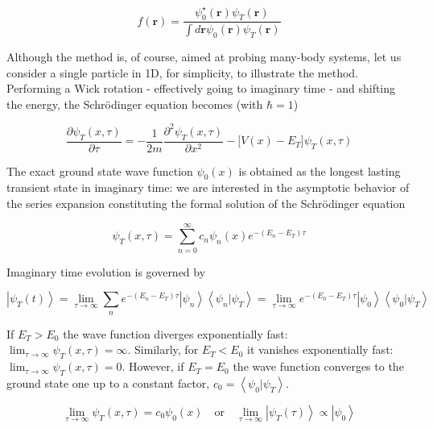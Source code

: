 \begin{equation}
f(\bm r) = \frac{\psi_0^\star (\bm r) \psi_T (\bm r) }{ \int d\bm r  \psi_0 (\bm r) \psi_T (\bm r)}
\end{equation}

Although the method is, of course, aimed at probing many-body systems, let us consider a single particle in \acs{1D}, for simplicity, to illustrate the method.
Performing a Wick rotation - effectively going to imaginary time - and shifting the energy, the Schr\"odinger equation becomes (with $\hbar = 1$)

\begin{equation}
\frac{\partial \psi_T ( x, \tau )}{\partial\tau}  = -\frac{1}{2m}\frac{\partial^2 \psi_T ( x, \tau )}{\partial x^2} - \bigg[ V(x) - E_T \bigg] \psi_T( x, \tau ) 
\end{equation}

The exact ground state wave function $\psi_0 ( x )$ is obtained as the longest lasting transient state in imaginary time: we are interested in the asymptotic behavior of the series expansion constituting the formal solution of the Schr\"odinger equation

\begin{equation}
\psi_T (x, \tau) = \sum_{n=0}^{\infty} c_n \psi_n (x) e^{-(E_n - E_T)\tau}
\end{equation}

Imaginary time evolution is governed by

\begin{equation}\label{eq:im_ev}
\left| \psi_T (t) \right\rangle = \lim_{\tau \rightarrow \infty} \sum_n e^{-(E_n - E_T) \tau} \left|\psi_n \right\rangle \left\langle \psi_n | \psi_T \right\rangle = \lim_{\tau \rightarrow \infty} e^{-(E_0 - E_T)\tau} \left| \psi_0 \right\rangle \left\langle \psi_0 | \psi_T \right\rangle 
\end{equation}

If $E_T > E_0$ the wave function diverges exponentially fast: $\lim_{\tau \rightarrow \infty} \psi_T ( x, \tau) = \infty$.
Similarly, for $E_T < E_0$ it vanishes exponentially fast: $\lim_{\tau \rightarrow \infty} \psi_T ( x, \tau) = 0$.
However, if $E_T = E_0$ the wave function converges to the ground state one up to a constant factor, $c_0 = \left\langle \psi_0 | \psi_T \right\rangle$.

\begin{equation}\label{eq:dmc}
\lim_{\tau \rightarrow \infty} \psi_T ( x, \tau) = c_0 \psi_0 (x) \quad \text{or} \quad \lim_{\tau \rightarrow \infty} \left|\psi_T (\tau) \right\rangle \propto \left| \psi_0 \right\rangle
\end{equation}

